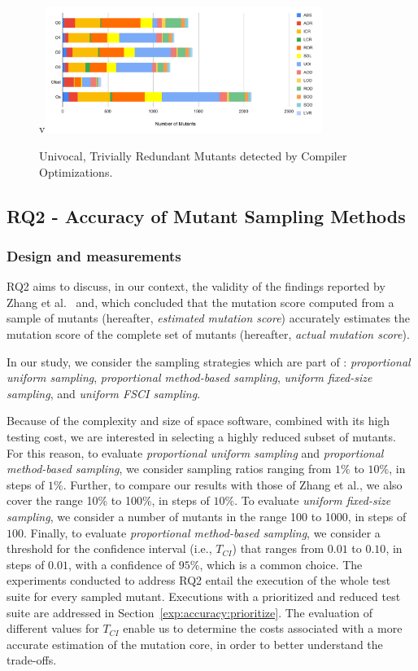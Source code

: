 \begin{figure}[tb]
\begin{center}
v\includegraphics[width=9cm]{images/univ-red}
\caption{Univocal, Trivially Redundant Mutants detected by Compiler Optimizations.}
\label{fig:results:univred}
\end{center}
\end{figure}

\subsection{RQ2 - Accuracy of Mutant Sampling Methods}

\subsubsection*{Design and measurements}


RQ2 aims to discuss, in our context, the validity of the findings reported by Zhang et al.~\cite{zhang2013operator} and, which concluded that the mutation score  computed from a sample of mutants (hereafter, \emph{estimated mutation score}) accurately estimates the mutation score of the complete set of mutants (hereafter, \emph{actual mutation score}).

In our study, we consider the sampling strategies which are part of \APPR: \emph{proportional uniform sampling}, \emph{proportional method-based sampling},  \emph{uniform fixed-size sampling}, and \emph{uniform FSCI sampling}. 


Because of the complexity and size of space software, combined with its high testing cost, we are interested in selecting a highly reduced subset of mutants. 
For this reason, 
to evaluate  \emph{proportional uniform sampling} and \emph{proportional method-based sampling},
we consider sampling ratios ranging from $1\%$ to $10\%$, in steps of $1\%$. Further, to compare our results with those of Zhang et al., we also cover the range 10\% to 100\%, in steps of $10\%$. To evaluate  \emph{uniform fixed-size sampling}, we consider a number of mutants in the range 100 to 1000, in steps of $100$.
Finally, to evaluate \emph{proportional method-based sampling}, we consider a threshold for the confidence interval (i.e., $T_{\mathit{CI}}$) that ranges from $0.01$ to $0.10$, in steps of $0.01$, with a confidence of $95\%$, which is a common choice. The experiments conducted to address RQ2 entail the execution of the whole test suite for every sampled mutant. Executions with a prioritized and reduced test suite are addressed in Section~\ref{exp:accuracy:prioritize}. The evaluation of different values for $T_{\mathit{CI}}$ enable us to determine the costs associated with a more accurate estimation of the mutation core, in order to better understand the trade-offs.


